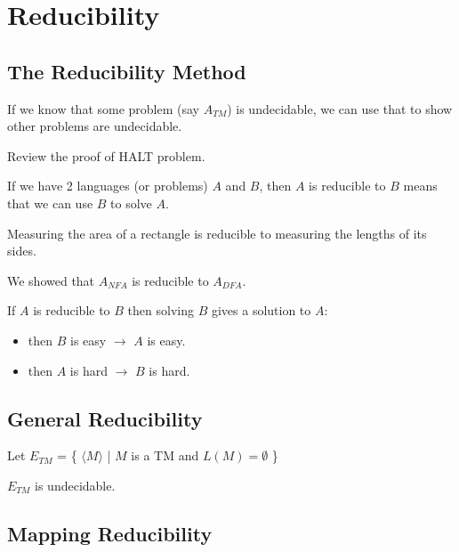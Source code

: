 \chapter{Reducibility}

\section{The Reducibility Method}
If we know that some problem (say \(A_{TM}\)) is undecidable, we can use that to show other problems are undecidable.

\begin{remark}
    Review the proof of HALT problem.
\end{remark}

\begin{definition}[Reducibility]
    If we have 2 languages (or problems) \(A\) and \(B\), then \(A\) is reducible to \(B\) means that we can use \(B\) to solve \(A\).  
\end{definition}

\begin{example}
    Measuring the area of a rectangle is reducible to measuring the lengths of its sides.
\end{example}

\begin{example}
    We showed that \(A_{NFA}\) is reducible to \(A_{DFA}\). 
\end{example}


If \(A\) is reducible to \(B\) then solving \(B\) gives a solution to \(A\):
\begin{itemize}
    \item then \(B\) is easy \(\rightarrow\) \(A\) is easy.   
    \item then \(A\) is hard \(\rightarrow\) \(B\) is hard.   
\end{itemize}  


\section{General Reducibility}

\begin{theorem}
    Let \(E_{TM}\) = \{ \(\langle M \rangle\) | \(M\) is a TM and \(L(M) = \emptyset\) \}

    \(E_{TM}\) is undecidable. 
\end{theorem}


\section{Mapping Reducibility}

